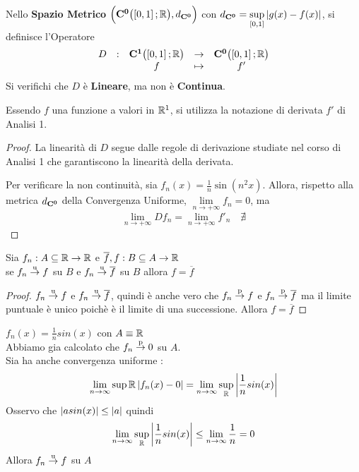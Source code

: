 \begin{proposition}
	\label{prop:operat_D_non_cont}
	Nello \textbf{Spazio Metrico} $\Bigl( \mathbf{C^{0}}\bigl( \left[0,1\right]; \mathbb{R} \bigr), d_{\mathbf{C^{0}}} \Bigr)$ con $d_{\mathbf{C^{0}}} = \sup\limits_{\left[0,1\right]} \left|g(x) - f(x)\right|$, si definisce l'Operatore
	\[
		\begin{array}{ccccc} {D} & : & {
			\mathbf{C^{1}}\bigl( \left[0,1\right]; \mathbb{R} \bigr)
		} & \to & {
			\mathbf{C^{0}}\bigl( \left[0,1\right]; \mathbb{R} \bigr)
		} \\ & & {f} & \mapsto & {f'} \\ \end{array}
	\]
	Si verifichi che $D$ è \textbf{Lineare}, ma non è \textbf{Continua}.
	\begin{note}
		Essendo $f$ una funzione a valori in $\mathbb{R}^1$, si utilizza la  notazione di derivata $f'$ di Analisi 1.
	\end{note}
	\begin{proof}
		La linearità di $D$ segue dalle regole di derivazione studiate nel corso di Analisi 1 che garantiscono la linearità della derivata.

		Per verificare la non continuità, sia $f_n(x) = \frac{1}{n} \sin(n^2 x)$. Allora, rispetto alla metrica $d_{\mathbf{C^{0}}}$ della Convergenza Uniforme, $\lim\limits_{n \to +\infty} f_n = 0$, ma
		\[\lim\limits_{n \to +\infty} Df_n = \lim\limits_{n \to +\infty} f'_n \quad \nexists\]
	\end{proof}
\end{proposition}

\begin{example}
	\label{ex:BBBBBBBBBB}
\end{example}
\begin{definition}
	\label{def:AAAAAAAAA}
\end{definition}

\proposition
Sia $f_n:A\subseteq \mathbb{R}\to \mathbb{R}$ e $\overline{f},f:B\subseteq A\to \mathbb{R}$\\
se $f_n \overset{\text{u}}{\to} f$ su $B$ e $f_n \overset{\text{u}}{\to} \overline{f}$ su $B$ allora $f=\overline{f}$
\begin{proof}
	$f_n \overset{\text{u}}{\to} f$ e $f_n \overset{\text{u}}{\to} \overline{f}$, quindi è anche vero che $f_n \overset{\text{p}}{\to} f$ e $f_n \overset{\text{p}}{\to} \overline{f}$ ma il limite puntuale è unico poichè è il limite di una successione. Allora $f=\overline{f}$
\end{proof}
\example
$f_n(x)=\frac{1}{n}sin(x)$ con $A\equiv \mathbb{R}$\\
Abbiamo gia calcolato che $f_n \overset{\text{p}}{\to} 0$ su $A$.\\
Sia ha anche convergenza uniforme :
\[\lim\limits_{n\to\infty}\sup{ \mathbb{R}}\left|f_n(x)-0\right| = \lim\limits_{n\to\infty}\sup\limits_{ \mathbb{R}}\left|\frac{1}{n}sin(x)\right|\]
Osservo che $\left|asin(x)\right| \leq \left|a\right|$ quindi
\[\lim\limits_{n\to\infty}\sup\limits_{ \mathbb{R}}\left|\frac{1}{n}sin(x)\right| \leq \lim\limits_{n\to\infty}\frac{1}{n}=0\]
Allora $f_n \overset{\text{u}}{\to} f$ su $A$


